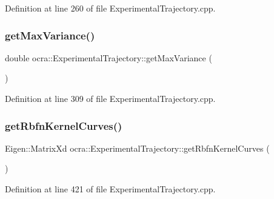 Definition at line 260 of file Experimental\+Trajectory.\+cpp.

\hypertarget{classocra_1_1ExperimentalTrajectory_a76f4aa686308735dec24eec98d4c0ab8}{}\label{classocra_1_1ExperimentalTrajectory_a76f4aa686308735dec24eec98d4c0ab8} 
\subsubsection{\texorpdfstring{get\+Max\+Variance()}{getMaxVariance()}}
{\footnotesize\ttfamily double ocra\+::\+Experimental\+Trajectory\+::get\+Max\+Variance (\begin{DoxyParamCaption}{ }\end{DoxyParamCaption})}



Definition at line 309 of file Experimental\+Trajectory.\+cpp.

\hypertarget{classocra_1_1ExperimentalTrajectory_ae3a97f92f11c74f9ffc42c33a8a95149}{}\label{classocra_1_1ExperimentalTrajectory_ae3a97f92f11c74f9ffc42c33a8a95149} 
\subsubsection{\texorpdfstring{get\+Rbfn\+Kernel\+Curves()}{getRbfnKernelCurves()}}
{\footnotesize\ttfamily Eigen\+::\+Matrix\+Xd ocra\+::\+Experimental\+Trajectory\+::get\+Rbfn\+Kernel\+Curves (\begin{DoxyParamCaption}{ }\end{DoxyParamCaption})}



Definition at line 421 of file Experimental\+Trajectory.\+cpp.

\hypertarget{classocra_1_1ExperimentalTrajectory_a1c3d421e3b08e2332747c6c3559d8b2d}{}\label{classocra_1_1ExperimentalTrajectory_a1c3d421e3b08e2332747c6c3559d8b2d} 
